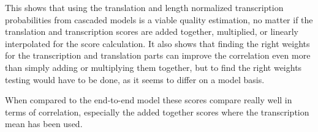 This shows that using the translation and length normalized transcription probabilities from cascaded models is a viable quality estimation, no matter if the translation and transcription scores are added together, multiplied, or linearly interpolated for the score calculation. It also shows that finding the right weights for the transcription and translation parts can improve the correlation even more than simply adding or multiplying them together, but to find the right weights testing would have to be done, as it seems to differ on a model basis.

When compared to the end-to-end model these scores compare really well in terms of correlation, especially the added together scores where the transcription mean has been used. 



